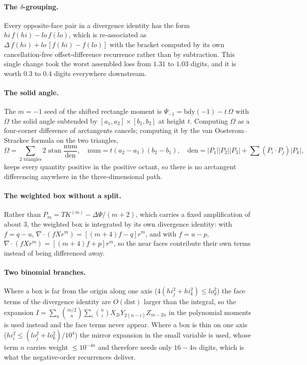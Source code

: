 \documentclass[11pt]{article}
\theoremstyle{remark}
\newcommand{\atan}{\operatorname{atan}}
\begin{document}
\paragraph{The $\delta$-grouping.} Every opposite-face pair in a divergence identity has
the form $hi\,f(hi) - lo\,f(lo)$, which is re-associated as
$\Delta\,f(hi) + lo\,[f(hi)-f(lo)]$ with the bracket computed by its own cancellation-free
offset-difference recurrence rather than by subtraction. This single change took the worst
assembled loss from $1.31$ to $1.03$ digits, and it is worth $0.3$ to $0.4$ digits
everywhere downstream.

\paragraph{The solid angle.} The $m = -1$ seed of the shifted rectangle moment is
$\Psi_{-1} = \mathrm{bdy}(-1) - t\,\Omega$ with $\Omega$ the solid angle subtended by
$[a_1,a_2]\times[b_1,b_2]$ at height $t$. Computing $\Omega$ as a four-corner difference of
arctangents cancels; computing it by the van Oosterom--Strackee formula on the two
triangles,
\begin{equation}
\Omega = \sum_{\text{2 triangles}} 2\atan\frac{\mathrm{num}}{\mathrm{den}},\quad
\mathrm{num} = t(a_2-a_1)(b_2-b_1),\quad
\mathrm{den} = |P_1||P_2||P_3| + \textstyle\sum (P_i\!\cdot\!P_j)|P_k|,
\end{equation}
keeps every quantity positive in the positive octant, so there is no arctangent
differencing anywhere in the three-dimensional path.

\paragraph{The weighted box without a split.} Rather than $P_m = TK^{(m)} - \Delta\Psi/(m+2)$,
which carries a fixed amplification of about $3$, the weighted box is integrated by its own
divergence identity: with $f = q-u$, $\nabla\cdot(fXr^m) = [(m+4)f - q]r^m$, and with
$f = u-p$, $\nabla\cdot(fXr^m) = [(m+4)f + p]r^m$, so the near faces contribute their own
terms instead of being differenced away.

\paragraph{Two binomial branches.} Where a box is far from the origin along one axis
($4(hi_j^2+hi_k^2)\le lo_d^2$) the face terms of the divergence identity are $O(\text{dist})$
larger than the integral, so the expansion
$I = \sum_n\binom{m/2}{n}\sum_i\binom{n}{i}X_{2i}Y_{2(n-i)}Z_{m-2n}$ in the polynomial
moments is used instead and the face terms never appear. Where a box is thin on one axis
($hi_i^2 \le (lo_j^2+lo_k^2)/10^4$) the mirror expansion in the small variable is used,
whose term $n$ carries weight $\le 10^{-4n}$ and therefore needs only $16-4n$ digits, which
is what the negative-order recurrences deliver.
\end{document}

